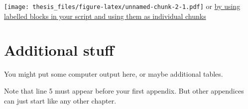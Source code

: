 \documentclass[honours,12pt,twoside]{unswthesis}
\numberwithin{equation}{section}
\begin{document}
\texttt{[image: thesis\_files/figure-latex/unnamed-chunk-2-1.pdf]}
or \href{https://bookdown.org/yihui/rmarkdown-cookbook/read-chunk.html}{by using labelled blocks in your script and using them as individual chunks}

\appendix

\hypertarget{additional-stuff}{%
\chapter{Additional stuff}\label{additional-stuff}}

You might put some computer output here, or maybe additional tables.

Note that line 5 must appear before your first appendix. But other appendices can just start like any other chapter.






\clearpage


\printbibliography[title=References, heading=bibintoc]
\end{document}
